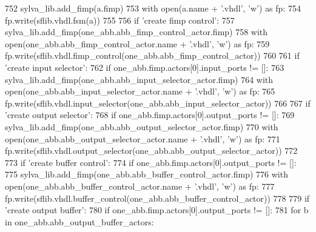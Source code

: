 \begin{DoxyCode}
752                     sylva\_lib.add\_fimp(a.fimp)
753                     with open(a.name + \textcolor{stringliteral}{'.vhdl'}, \textcolor{stringliteral}{'w'}) \textcolor{keyword}{as} fp:
754                         fp.write(sflib.vhdl.fsm(a))
755 
756             \textcolor{keywordflow}{if} \textcolor{stringliteral}{'create fimp control'}:
757                 sylva\_lib.add\_fimp(one\_abb.abb\_fimp\_control\_actor.fimp)
758                 with open(one\_abb.abb\_fimp\_control\_actor.name + \textcolor{stringliteral}{'.vhdl'}, \textcolor{stringliteral}{'w'}) \textcolor{keyword}{as} fp:
759                     fp.write(sflib.vhdl.fimp\_control(one\_abb.abb\_fimp\_control\_actor))
760 
761             \textcolor{keywordflow}{if} \textcolor{stringliteral}{'create input selector'}:
762                 \textcolor{keywordflow}{if} one\_abb.fimp.actors[0].input\_ports != []:
763                     sylva\_lib.add\_fimp(one\_abb.abb\_input\_selector\_actor.fimp)
764                     with open(one\_abb.abb\_input\_selector\_actor.name + \textcolor{stringliteral}{'.vhdl'}, \textcolor{stringliteral}{'w'}) \textcolor{keyword}{as} fp:
765                         fp.write(sflib.vhdl.input\_selector(one\_abb.abb\_input\_selector\_actor))
766 
767             \textcolor{keywordflow}{if} \textcolor{stringliteral}{'create output selector'}:
768                 \textcolor{keywordflow}{if} one\_abb.fimp.actors[0].output\_ports != []:
769                     sylva\_lib.add\_fimp(one\_abb.abb\_output\_selector\_actor.fimp)
770                     with open(one\_abb.abb\_output\_selector\_actor.name + \textcolor{stringliteral}{'.vhdl'}, \textcolor{stringliteral}{'w'}) \textcolor{keyword}{as} fp:
771                         fp.write(sflib.vhdl.output\_selector(one\_abb.abb\_output\_selector\_actor))
772 
773             \textcolor{keywordflow}{if} \textcolor{stringliteral}{'create buffer control'}:
774                 \textcolor{keywordflow}{if} one\_abb.fimp.actors[0].output\_ports != []:
775                     sylva\_lib.add\_fimp(one\_abb.abb\_buffer\_control\_actor.fimp)
776                     with open(one\_abb.abb\_buffer\_control\_actor.name + \textcolor{stringliteral}{'.vhdl'}, \textcolor{stringliteral}{'w'}) \textcolor{keyword}{as} fp:
777                         fp.write(sflib.vhdl.buffer\_control(one\_abb.abb\_buffer\_control\_actor))
778 
779             \textcolor{keywordflow}{if} \textcolor{stringliteral}{'create output buffer'}:
780                 \textcolor{keywordflow}{if} one\_abb.fimp.actors[0].output\_ports != []:
781                     \textcolor{keywordflow}{for} b \textcolor{keywordflow}{in} one\_abb.abb\_output\_buffer\_actors:

\end{DoxyCode}

